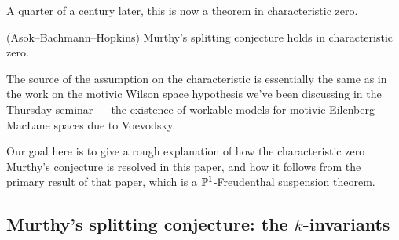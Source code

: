 \documentclass[11pt,openany]{book}
\begin{document}
A quarter of a century later, this is now a theorem in characteristic zero.

\begin{theorem} \cite[Theorem~3]{Freudenthal} (Asok--Bachmann--Hopkins) Murthy's splitting conjecture holds in characteristic zero.
\end{theorem}

The source of the assumption on the characteristic is essentially the same as in the work on the motivic Wilson space hypothesis we've been discussing in the Thursday seminar --- the existence of workable models for motivic Eilenberg--MacLane spaces due to Voevodsky.

Our goal here is to give a rough explanation of how the characteristic zero Murthy's conjecture is resolved in this paper, and how it follows from the primary result of that paper, which is a $\P^1$-Freudenthal suspension theorem.

\subsection{Murthy's splitting conjecture: the $k$-invariants}
\end{document}
